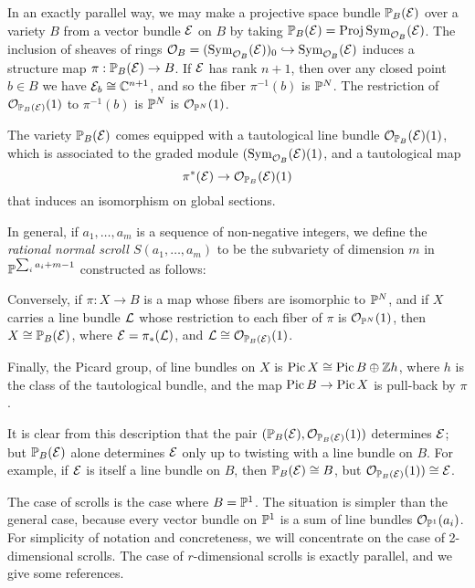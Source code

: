 In an exactly parallel way, we may make a projective space bundle $\PP_B(\sE)$ over a variety $B$ from a vector bundle $\sE$ on  $B$ 
by taking $\PP_B(\sE) = \Proj \Sym_{\sO_{B}} (\sE)$.
The inclusion of sheaves of rings
$\sO_{B}  = (\Sym_{\sO_{B}}(\sE))_{0} \hookrightarrow \Sym_{\sO_{B}}(\sE)$ induces a structure map
$\pi: \PP_B(\sE) \to B$. If $\sE$ has rank $n+1$, then over any closed point $b\in B$ we have
$\sE_{b} \cong \CC^{n+1}$, and so the fiber $\pi^{-1}(b)$ is $\PP^{N}$. The restriction of 
$\sO_{\PP_B(\sE)}(1)$ to $\pi^{-1}(b)$ is $\PP^{N}$ is $\sO_{\PP^{N}}(1)$.

The variety $\PP_{B}(\sE)$ comes equipped with a tautological line bundle $\sO_{\PP_{B}}(\sE)(1)$, which is associated to the graded module $(\Sym_{\sO_{B}} (\sE)(1)$, and a tautological map 
$$
\pi^{*}(\sE) \to \sO_{\PP_{B}}(\sE)(1)
$$
that induces an isomorphism on global sections.


In general, if $a_1,\dots, a_m$ is a sequence of non-negative integers, we define the  \emph{rational normal scroll $S(a_1,\dots, a_m)$} 
to be the subvariety of dimension $m$ in $\PP^{\sum_i a_i+m-1}$ constructed as follows:


Conversely, if $\pi: X\to B$ is a map whose fibers are isomorphic to $\PP^{N}$, and if $X$ carries a line bundle $\sL$ whose restriction to each fiber of $\pi$ is $\sO_{\PP^{N}}(1)$, then $X\cong \PP_{B}(\sE)$,
where $\sE = \pi_{*}(\sL)$, and $\sL \cong \sO_{\PP_{B}(\sE)}(1)$.

Finally, the Picard group, of line bundles on $X$ is
$\Pic X \cong \Pic B \oplus \ZZ h$, where $h$ is the class of the tautological bundle, and
the map $\Pic B\to \Pic X$ is pull-back by $\pi$.

It is clear from this description that the pair $(\PP_{B}(\sE), \sO_{\PP_{B}(\sE)}(1))$ determines $\sE$; but 
$\PP_{B}(\sE)$ alone determines $\sE$ only up to twisting with a line bundle on $B$. For example, 
if $\sE$ is itself a line bundle on $B$, then $\PP_{B}(\sE) \cong  B$, but $\sO_{\PP_{B}(\sE)}(1)) \cong \sE$.

The case of scrolls is the case where $B =\PP^{1}$. The situation is simpler than the general case, 
because every vector bundle
on $\PP^{1}$ is a sum of line bundles $\sO_{\PP^{1}}(a_{i})$. For simplicity of notation and concreteness, we will concentrate on the case of 2-dimensional scrolls. The case of $r$-dimensional scrolls is exactly parallel, and we give some references. 
 
